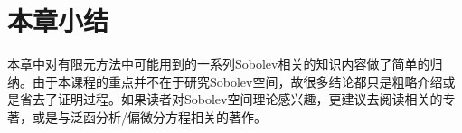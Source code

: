 \section{本章小结}
本章中对有限元方法中可能用到的一系列Sobolev相关的知识内容做了简单的归纳。由于本课程的重点并不在于研究Sobolev空间，故很多结论都只是粗略介绍或是省去了证明过程。如果读者对Sobolev空间理论感兴趣，更建议去阅读相关的专著，或是与泛函分析/偏微分方程相关的著作。